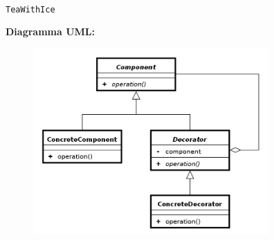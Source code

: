 \begin{solution}
\begin{itemize}
\\
\texttt{TeaWithIce}
\end{itemize}
\textbf{Diagramma UML:}
\begin{figure}[htb!]
	\centering
	\label{ObserverPattern}
	\includegraphics[width=9cm]{./immagini/decoratorPattern.png}
\end{figure}
\end{solution}

